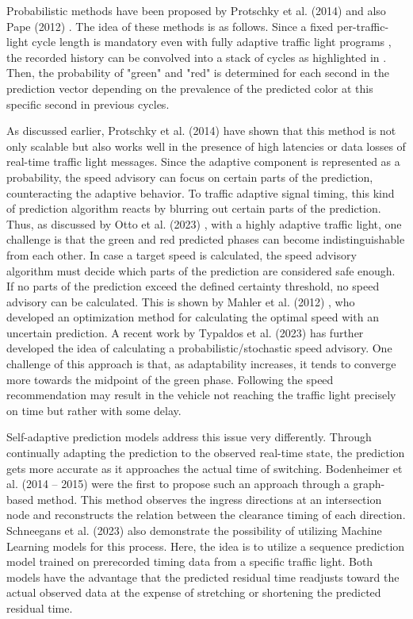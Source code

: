 Probabilistic methods have been proposed by Protschky et al. (2014) \cite{protschky_extensive_2014, protschky_adaptive_2014} and also Pape (2012) \cite{pape_untersuchung_2012}. The idea of these methods is as follows. Since a fixed per-traffic-light cycle length is mandatory even with fully adaptive traffic light programs \cite{protschky_extensive_2014}, the recorded history can be convolved into a stack of cycles as highlighted in . Then, the probability of "green" and "red" is determined for each second in the prediction vector depending on the prevalence of the predicted color at this specific second in previous cycles.

As discussed earlier, Protschky et al. (2014) \cite{protschky_extensive_2014, protschky_adaptive_2014} have shown that this method is not only scalable but also works well in the presence of high latencies or data losses of real-time traffic light messages. Since the adaptive component is represented as a probability, the speed advisory can focus on certain parts of the prediction, counteracting the adaptive behavior. To traffic adaptive signal timing, this kind of prediction algorithm reacts by blurring out certain parts of the prediction. Thus, as discussed by Otto et al. (2023) \cite{otto_framework_2023}, with a highly adaptive traffic light, one challenge is that the green and red predicted phases can become indistinguishable from each other. In case a target speed is calculated, the speed advisory algorithm must decide which parts of the prediction are considered safe enough. If no parts of the prediction exceed the defined certainty threshold, no speed advisory can be calculated. This is shown by Mahler et al. (2012) \cite{mahler_reducing_2012}, who developed an optimization method for calculating the optimal speed with an uncertain prediction. A recent work by Typaldos et al. (2023) \cite{typaldos_modified_2023} has further developed the idea of calculating a probabilistic/stochastic speed advisory. One challenge of this approach is that, as adaptability increases, it tends to converge more towards the midpoint of the green phase. Following the speed recommendation may result in the vehicle not reaching the traffic light precisely on time but rather with some delay.

Self-adaptive prediction models address this issue very differently. Through continually adapting the prediction to the observed real-time state, the prediction gets more accurate as it approaches the actual time of switching. Bodenheimer et al. (2014 -- 2015) \cite{bodenheimer_enabling_2014, bodenheimer_glosa_2015} were the first to propose such an approach through a graph-based method. This method observes the ingress directions at an intersection node and reconstructs the relation between the clearance timing of each direction. Schneegans et al. (2023) \cite{schneegans_prediction_2023} also demonstrate the possibility of utilizing Machine Learning models for this process. Here, the idea is to utilize a sequence prediction model trained on prerecorded timing data from a specific traffic light. Both models have the advantage that the predicted residual time readjusts toward the actual observed data at the expense of stretching or shortening the predicted residual time.

